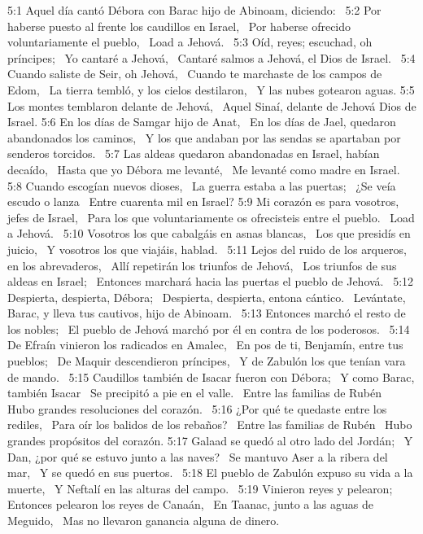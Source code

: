 5:1 Aquel día cantó Débora con Barac hijo de Abinoam, diciendo:  
5:2 Por haberse puesto al frente los caudillos en Israel,  
Por haberse ofrecido voluntariamente el pueblo,  
Load a Jehová.  
5:3 Oíd, reyes; escuchad, oh príncipes;  
Yo cantaré a Jehová,  
Cantaré salmos a Jehová, el Dios de Israel.  
5:4 Cuando saliste de Seir, oh Jehová,  
Cuando te marchaste de los campos de Edom,  
La tierra tembló, y los cielos destilaron,  
Y las nubes gotearon aguas. 
5:5 Los montes temblaron delante de Jehová,  
Aquel Sinaí, delante de Jehová Dios de Israel. 
5:6 En los días de Samgar hijo de Anat,  
En los días de Jael, quedaron abandonados los caminos,  
Y los que andaban por las sendas se apartaban por senderos torcidos.  
5:7 Las aldeas quedaron abandonadas en Israel, habían decaído,  
Hasta que yo Débora me levanté,  
Me levanté como madre en Israel. 
5:8 Cuando escogían nuevos dioses,  
La guerra estaba a las puertas;  
¿Se veía escudo o lanza  
Entre cuarenta mil en Israel? 
5:9 Mi corazón es para vosotros, jefes de Israel,  
Para los que voluntariamente os ofrecisteis entre el pueblo.  
Load a Jehová.  
5:10 Vosotros los que cabalgáis en asnas blancas,  
Los que presidís en juicio,  
Y vosotros los que viajáis, hablad.  
5:11 Lejos del ruido de los arqueros, en los abrevaderos,  
Allí repetirán los triunfos de Jehová,  
Los triunfos de sus aldeas en Israel;  
Entonces marchará hacia las puertas el pueblo de Jehová.  
5:12 Despierta, despierta, Débora;  
Despierta, despierta, entona cántico.  
Levántate, Barac, y lleva tus cautivos, hijo de Abinoam.  
5:13 Entonces marchó el resto de los nobles;  
El pueblo de Jehová marchó por él en contra de los poderosos.  
5:14 De Efraín vinieron los radicados en Amalec,  
En pos de ti, Benjamín, entre tus pueblos;  
De Maquir descendieron príncipes,  
Y de Zabulón los que tenían vara de mando.  
5:15 Caudillos también de Isacar fueron con Débora;  
Y como Barac, también Isacar  
Se precipitó a pie en el valle.  
Entre las familias de Rubén  
Hubo grandes resoluciones del corazón.  
5:16 ¿Por qué te quedaste entre los rediles,  
Para oír los balidos de los rebaños?  
Entre las familias de Rubén  
Hubo grandes propósitos del corazón. 
5:17 Galaad se quedó al otro lado del Jordán;  
Y Dan, ¿por qué se estuvo junto a las naves?  
Se mantuvo Aser a la ribera del mar,  
Y se quedó en sus puertos.  
5:18 El pueblo de Zabulón expuso su vida a la muerte,  
Y Neftalí en las alturas del campo.  
5:19 Vinieron reyes y pelearon;  
Entonces pelearon los reyes de Canaán,  
En Taanac, junto a las aguas de Meguido,  
Mas no llevaron ganancia alguna de dinero.  
